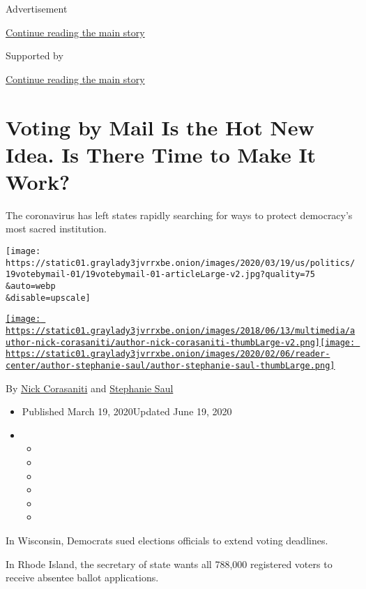Advertisement

\protect\hyperlink{after-top}{Continue reading the main story}

Supported by

\protect\hyperlink{after-sponsor}{Continue reading the main story}

\hypertarget{voting-by-mail-is-the-hot-new-idea-is-there-time-to-make-it-work}{%
\section{Voting by Mail Is the Hot New Idea. Is There Time to Make It
Work?}\label{voting-by-mail-is-the-hot-new-idea-is-there-time-to-make-it-work}}

The coronavirus has left states rapidly searching for ways to protect
democracy's most sacred institution.

\texttt{[image: https://static01.graylady3jvrrxbe.onion/images/2020/03/19/us/politics/19votebymail-01/19votebymail-01-articleLarge-v2.jpg?quality=75\\\&auto=webp\\\&disable=upscale]}

\href{https://www.nytimes3xbfgragh.onion/by/nick-corasaniti}{\texttt{[image: https://static01.graylady3jvrrxbe.onion/images/2018/06/13/multimedia/author-nick-corasaniti/author-nick-corasaniti-thumbLarge-v2.png]}}\href{https://www.nytimes3xbfgragh.onion/by/stephanie-saul}{\texttt{[image: https://static01.graylady3jvrrxbe.onion/images/2020/02/06/reader-center/author-stephanie-saul/author-stephanie-saul-thumbLarge.png]}}

By \href{https://www.nytimes3xbfgragh.onion/by/nick-corasaniti}{Nick
Corasaniti} and
\href{https://www.nytimes3xbfgragh.onion/by/stephanie-saul}{Stephanie
Saul}

\begin{itemize}
\item
  Published March 19, 2020Updated June 19, 2020
\item
  \begin{itemize}
  \item
  \item
  \item
  \item
  \item
  \item
  \end{itemize}
\end{itemize}

In Wisconsin, Democrats sued elections officials to extend voting
deadlines.

In Rhode Island, the secretary of state wants all 788,000 registered
voters to receive absentee ballot applications.

